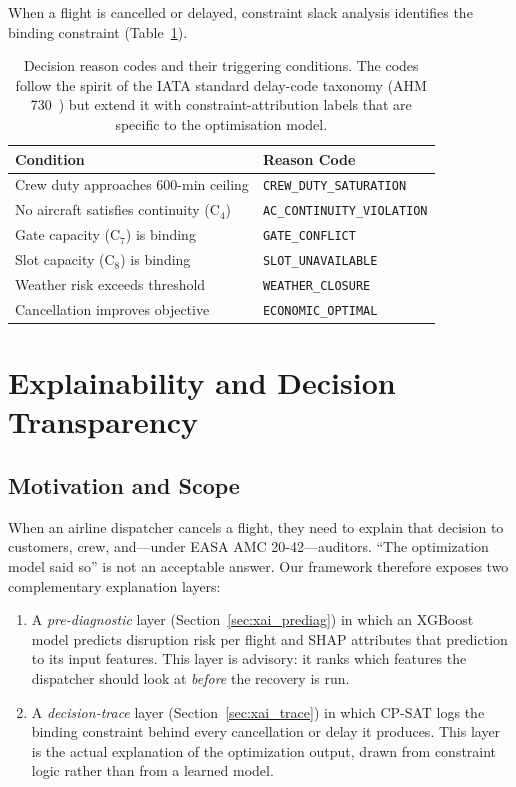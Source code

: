 \documentclass[12pt,number]{elsarticle}
\begin{document}
When a flight is cancelled or delayed, constraint slack analysis identifies the binding constraint (Table~\ref{tab:reasons}).

\begin{table}[H]
\centering
\small
\caption{Decision reason codes and their triggering conditions. The codes follow the spirit of the IATA standard delay-code taxonomy (AHM 730~\cite{iata2023}) but extend it with constraint-attribution labels that are specific to the optimisation model.}
\label{tab:reasons}
\begin{tabular}{@{}ll@{}}
\toprule
\textbf{Condition} & \textbf{Reason Code} \\
\midrule
Crew duty approaches 600-min ceiling & \texttt{CREW\_DUTY\_SATURATION} \\
No aircraft satisfies continuity (C$_4$) & \texttt{AC\_CONTINUITY\_VIOLATION} \\
Gate capacity (C$_7$) is binding & \texttt{GATE\_CONFLICT} \\
Slot capacity (C$_8$) is binding & \texttt{SLOT\_UNAVAILABLE} \\
Weather risk exceeds threshold & \texttt{WEATHER\_CLOSURE} \\
Cancellation improves objective & \texttt{ECONOMIC\_OPTIMAL} \\
\bottomrule
\end{tabular}
\end{table}


\section{Explainability and Decision Transparency}
\label{sec:xai}

\subsection{Motivation and Scope}

When an airline dispatcher cancels a flight, they need to explain that decision to customers, crew, and---under EASA AMC 20-42---auditors. ``The optimization model said so'' is not an acceptable answer. Our framework therefore exposes two complementary explanation layers:

\begin{enumerate}
\item A \emph{pre-diagnostic} layer (Section~\ref{sec:xai_prediag}) in which an XGBoost model predicts disruption risk per flight and SHAP attributes that prediction to its input features. This layer is advisory: it ranks which features the dispatcher should look at \emph{before} the recovery is run.
\item A \emph{decision-trace} layer (Section~\ref{sec:xai_trace}) in which CP-SAT logs the binding constraint behind every cancellation or delay it produces. This layer is the actual explanation of the optimization output, drawn from constraint logic rather than from a learned model.
\end{enumerate}
\end{document}
